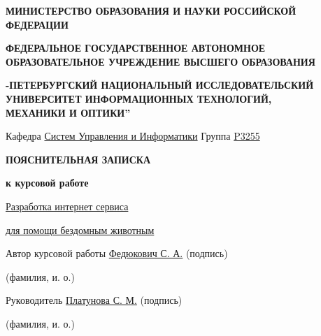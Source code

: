 \documentclass[12pt]{article}
\begin{document}
\pagestyle{empty}
\begin{center}
\bigskip\bigskip\bigskip\bigskip\bigskip\bigskip\bigskip\bigskip\bigskip\bigskip\bigskip\bigskip\bigskip\bigskip\bigskip\bigskip\bigskip\bigskip
\normalsize
\textbf{МИНИСТЕРСТВО ОБРАЗОВАНИЯ И НАУКИ РОССИЙСКОЙ ФЕДЕРАЦИИ}

\medskip 
\textbf{ФЕДЕРАЛЬНОЕ ГОСУДАРСТВЕННОЕ АВТОНОМНОЕ ОБРАЗОВАТЕЛЬНОЕ УЧРЕЖДЕНИЕ ВЫСШЕГО ОБРАЗОВАНИЯ}

\medskip 
\textbf{-ПЕТЕРБУРГСКИЙ НАЦИОНАЛЬНЫЙ ИССЛЕДОВАТЕЛЬСКИЙ }
\textbf{УНИВЕРСИТЕТ ИНФОРМАЦИОННЫХ ТЕХНОЛОГИЙ, }\\
\textbf{МЕХАНИКИ И ОПТИКИ\textquotedblright}

\bigskip\bigskip\bigskip\bigskip\bigskip

Кафедра \underline{\hspace{10pt}Систем Управления и Информатики\hspace{10pt}} Группа \underline{\hspace{20pt}P3255\hspace{20pt}}

\bigskip\bigskip\bigskip\bigskip\bigskip

\Large
\textbf{ПОЯСНИТЕЛЬНАЯ ЗАПИСКА} 

\textbf{к курсовой работе}
\bigskip\bigskip\bigskip\bigskip\bigskip

\uline{\hspace{90pt}Разработка интернет сервиса \hspace{90pt}}

\bigskip
\uline{\hspace{70pt}для помощи бездомным животным\hspace{70pt}}
\end{center}

\bigskip
\hspace{50pt} Автор курсовой работы \uline{\hspace{45pt}Федюкович С. А.\hspace{45pt}} (подпись)

\hspace{8cm} \scriptsize (фамилия, и. о.) \normalsize

\bigskip
\hspace{50pt} Руководитель \uline{\hspace{100pt}Платунова С. М.\hspace{40pt}} (подпись)

\hspace{8cm} \scriptsize (фамилия, и. о.) \normalsize
\end{document}
